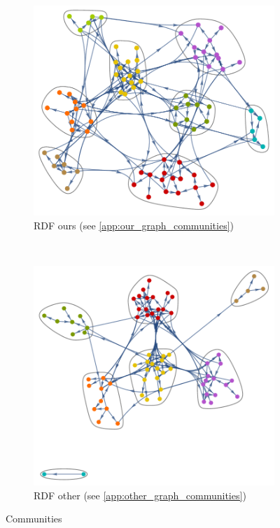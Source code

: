 \documentclass[english, 12pt]{article}
\begin{document}
\begin{figure}[H]
    \centering
    \begin{subfigure}[b]{0.45\textwidth}
        \centering
        \includegraphics[height=\textwidth]{CommunitiesRDFours.pdf}
        \caption{RDF ours (see \ref{app:our_graph_communities})}
    \end{subfigure}%
    ~ 
    \begin{subfigure}[b]{0.45\textwidth}
        \centering
        \includegraphics[height=\textwidth]{CommunitiesRDFother.pdf}
        \caption{RDF other (see \ref{app:other_graph_communities})}
    \end{subfigure}
    \caption{Communities}
\end{figure}
\end{document}
